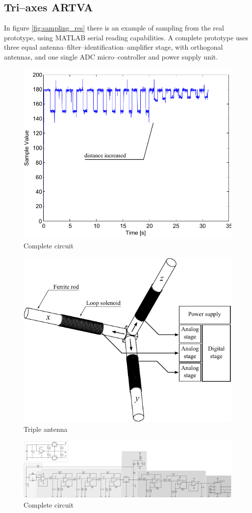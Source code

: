 \subsection{Tri--axes ARTVA}
In figure \ref{fig:sampling_res} there is an example of sampling from the real prototype, using MATLAB serial reading capabilities. A complete prototype uses three equal antenna--filter--identification--amplifier stage, with orthogonal antennas, and one single ADC micro--controller and power supply unit.
\begin{figure}[h]
	\centering
	\includegraphics[scale=0.6]{ch2/img/sampling_result.pdf}
	\caption{Complete circuit}
	\label{fig:samplig_res}
\end{figure}
\begin{figure}[h]
	\centering
	\includegraphics[scale=0.8]{ch2/img/triplantenna.pdf}
	\caption{Triple antenna}
	\label{fig:trantenna}
\end{figure}
\begin{figure}[p]
	\centering
	\includegraphics[scale=0.25,angle=90]{ch2/img/receiver3.pdf}
	\caption{Complete circuit}
	\label{fig:completecirc}
	\forceversofloat
\end{figure}